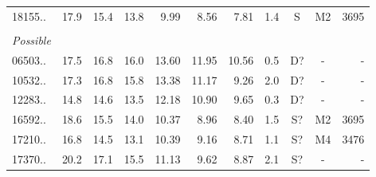\documentclass[11pt]{article}
\begin{document}
\begin{table}[htbp]
{\begin{tabular}{lrrr|rrrrccr}
18155.. & 17.9 & 15.4 & 13.8 & 9.99 & 8.56 & 7.81 & 1.4 & S & M2 & 3695 \\
 &  &  &  &  &  &  &  &  &  &  \\
\textit{Possible} &  &  &  &  &  &  &  &  &  &  \\
06503.. & 17.5 & 16.8 & 16.0 & 13.60 & 11.95 & 10.56 & 0.5 & D? & - & - \\
10532.. & 17.3 & 16.8 & 15.8 & 13.38 & 11.17 & 9.26 & 2.0 & D? & - & - \\
12283.. & 14.8 & 14.6 & 13.5 & 12.18 & 10.90 & 9.65 & 0.3 & D? & - & - \\
16592.. & 18.6 & 15.5 & 14.0 & 10.37 & 8.96 & 8.40 & 1.5 & S? & M2 & 3695 \\
17210.. & 16.8 & 14.5 & 13.1 & 10.39 & 9.16 & 8.71 & 1.1 & S? & M4 & 3476 \\
17370.. & 20.2 & 17.1 & 15.5 & 11.13 & 9.62 & 8.87 & 2.1 & S? & - & - \\
\hline
\end{tabular}
}
\end{table}
\end{document}
